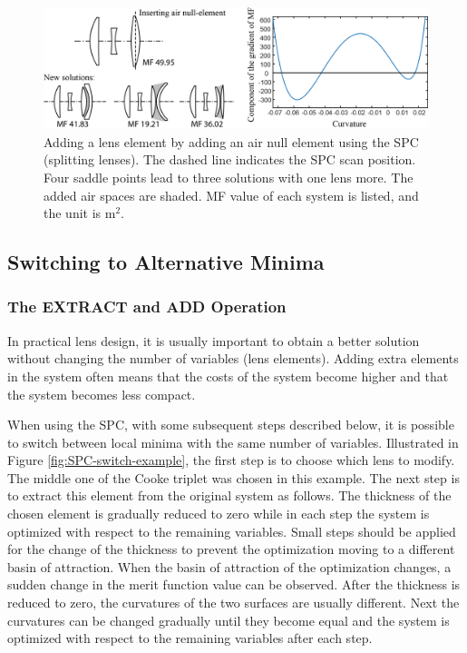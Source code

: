\begin{figure}[h!]
    \centering
    \includegraphics[scale=0.68]{chapter-2/figures/spc_add_air.png}
    \caption{Adding a lens element by adding an air null element using the SPC (splitting lenses). The dashed line indicates the SPC scan position. Four saddle points lead to three solutions with one lens more. The added air spaces are shaded. MF value of each system is listed, and the unit is \textmu m$^2$. }
    \label{fig:SPC-air null element}
\end{figure}

\label{cp2-switching}
\subsection{Switching to Alternative Minima}

\subsubsection{The EXTRACT and ADD Operation}
In practical lens design, it is usually important to obtain a better solution without changing the number of variables (lens elements). Adding extra elements in the system often means that the costs of the system become higher and that the system becomes less compact. 

When using the SPC, with some subsequent steps described below, it is possible to switch between local minima with the same number of variables. Illustrated in Figure \ref{fig:SPC-switch-example}, the first step is to choose which lens to modify. The middle one of the Cooke triplet was chosen in this example. The next step is to extract this element from the original system as follows. The thickness of the chosen element is gradually reduced to zero while in each step the system is optimized with respect to the remaining variables. Small steps should be applied for the change of the thickness to prevent the optimization moving to a different basin of attraction. When the basin of attraction of the optimization changes, a sudden change in the merit function value can be observed. After the thickness is reduced to zero, the curvatures of the two surfaces are usually different. Next the curvatures can be changed gradually until they become equal and the system is optimized with respect to the remaining variables after each step. 

